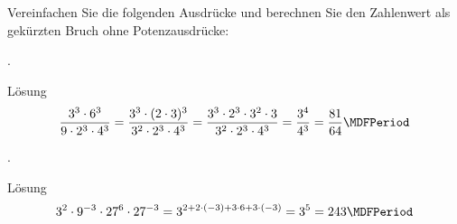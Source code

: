 \begin{MExercises}
\begin{MExercise}
Vereinfachen Sie die folgenden Ausdrücke und berechnen Sie den Zahlenwert als gekürzten Bruch ohne Potenzausdrücke:
\begin{MExerciseItems}
\item{.\\\begin{MHint}{Lösung} $$\Mdfrac{3^3\cdot 6^3}{9\cdot2^3\cdot 4^3}=\Mdfrac{3^3\cdot (2 \cdot 3)^3}{3^2\cdot2^3\cdot 4^3}=\Mdfrac{3^3\cdot 2^3 \cdot 3^2\cdot 3}{3^2\cdot2^3\cdot 4^3}=\Mdfrac{3^4}{4^3}=\Mdfrac{81}{64} \MDFPeriod$$\end{MHint}}
\item{.\\\begin{MHint}{Lösung} $$3^2\cdot 9^{-3}\cdot 27^{6}\cdot 27^{-3}=3^{2+2\cdot(-3)+3\cdot 6+3\cdot(-3)}=3^{5}=243 \MDFPeriod$$\end{MHint}}
\end{MExerciseItems}
\end{MExercise}

% 


\end{MExercises}


